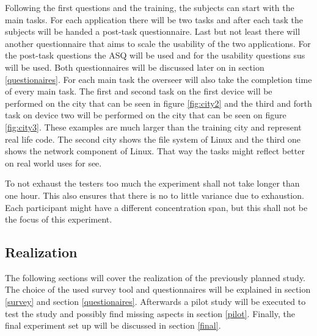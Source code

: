 Following the first questions and the training, the subjects can start with the main tasks.
For each application there will be two tasks and after each task the subjects will be handed a \gls{post-task} questionnaire.
Last but not least there will another questionnaire that aims to scale the \gls{usability} of the two applications.
For the \gls{post-task} questions the \gls{ASQ} will be used and for the \gls{usability} questions \gls{sus} will be used.
Both questionnaires will be discussed later on in section \ref{questionaires}.
For each main task the overseer will also take the completion time of every main task.
The first and second task on the first device will be performed on the \gls{city} that can be seen in figure \ref{fig:city2} and the third and forth task on device two will be performed on the \gls{city} that can be seen on figure \ref{fig:city3}.
These examples are much larger than the training \gls{city} and represent real life code.
The second \gls{city} shows the file system of Linux and the third one shows the network component of Linux.
That way the tasks might reflect better on real world uses for \gls{see}.

To not exhaust the testers too much the experiment shall not take longer than one hour.
This also ensures that there is no to little variance due to exhaustion.
Each participant might have a different concentration span, but this shall not be the focus of this experiment.

\subsection{Realization}
\label{real}
The following sections will cover the realization of the previously planned study. 
The choice of the used survey tool and questionnaires will be explained in section \ref{survey} and section \ref{questionaires}.
Afterwards a pilot study will be executed to test the study and possibly find missing aspects in section \ref{pilot}.
Finally, the final experiment set up will be discussed in section \ref{final}.

